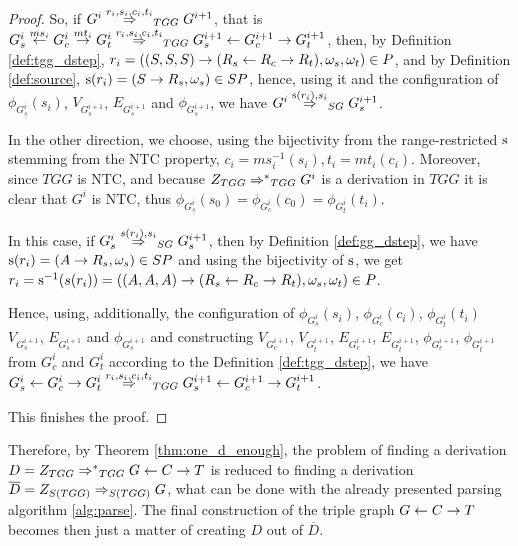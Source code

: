 \documentclass[runningheads]{llncs}
\begin{document}
\begin{proof}
	So, if $G^i \tderiv{r_{i}}{s_{i},c_{i},t_{i}}{TGG} G^{i+1}$, that is $G^i_s \ms{ms_i} G^i_c \mt{mt_i} G^i_t \tderiv{r_i}{s_i,c_i,t_i}{TGG} G^{i+1}_s \ms{} G^{i+1}_c \mt{} G^{i+1}_t$, then, by Definition \ref{def:tgg_dstep}, $r_i = ((S,S,S) \to (R_s \overset{}{\leftarrow} R_c \overset{}{\rightarrow} R_t), \omega_s, \omega_t) \in P$, and by Definition \ref{def:source}, $\operatorname{s}(r_i) = (S \to R_s, \omega_s) \in SP$, hence, using it and the configuration of $\phi_{G^i_s}(s_i)$, $V_{G^{i+1}_s}$, $E_{G^{i+1}_s}$ and $\phi_{G^{i+1}_s}$, we have $G^i \deriv{\source(r_i)}{s_i}{SG} G^{i+1}_s$.
	
	In the other direction, we choose, using the bijectivity from the range-restricted $\operatorname{s}$ stemming from the NTC property, $c_i = ms_i^{-1}(s_i), t_i = mt_i(c_i)$. Moreover, since $TGG$ is NTC, and because $\startTG{TGG} \tderivtr{}{}{TGG} G^i$ is a derivation in $TGG$ it is clear that $G^i$ is NTC, thus $\phi_{G^i_s}(s_0) = \phi_{G^i_c}(c_0) = \phi_{G^i_t}(t_i)$.
	
	In this case, if $G^{i}_s \deriv{s(r_i)}{s_i}{SG} G^{i+1}_s$, then by Definition \ref{def:gg_dstep}, we have $\operatorname{s}(r_i) = (A \to R_s, \omega_s) \in SP$ and using the bijectivity of $\operatorname{s}$, we get $r_i = \operatorname{s}^{-1}(s(r_i)) = ((A,A,A) \to (R_s \overset{}{\leftarrow} R_c \overset{}{\rightarrow} R_t), \omega_s, \omega_t) \in P$. 
	
	Hence, using, additionally, the configuration of $\phi_{G^i_s}(s_i)$, $\phi_{G^i_c}(c_i)$, $\phi_{G^i_t}(t_i)$ $V_{G^{i+1}_s}$, $E_{G^{i+1}_s}$ and $\phi_{G^{i+1}_s}$ and constructing $V_{G^{i+1}_c}$, $V_{G^{i+1}_t}$, $E_{G^{i+1}_c}$, $E_{G^{i+1}_t}$, $\phi_{G^{i+1}_c}$, $\phi_{G^{i+1}_t}$ from $G^i_c$ and $G^i_t$ according to the Definition \ref{def:tgg_dstep}, we have $ G^i_s \ms{} G^i_c \mt{} G^i_t \tderiv{r_i}{s_i,c_i,t_i}{TGG} G^{i+1}_s \ms{} G^{i+1}_c \mt{} G^{i+1}_t$.
	
	This finishes the proof.
	
\end{proof}

Therefore, by Theorem \ref{thm:one_d_enough}, the problem of finding a derivation $D = \startTG{TGG} \tderivtr{}{}{TGG} G \ms{} C \mt{} T$ is reduced to finding a derivation $\overline{D} = \startG{S(TGG)} \deriv{}{}{S(TGG)} G$, what can be done with the already presented parsing algorithm \ref{alg:parse}. The final construction of the triple graph $G \overset{}{\leftarrow} C \overset{}{\rightarrow} T$ becomes then just a matter of creating $D$ out of $\overline{D}$.

\end{document}
